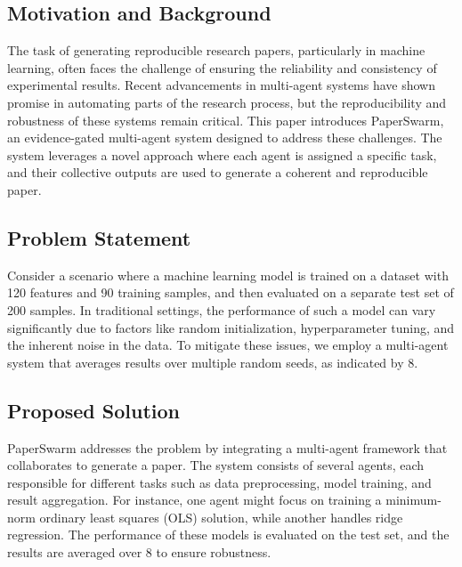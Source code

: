 \subsection{Motivation and Background}

The task of generating reproducible research papers, particularly in machine learning, often faces the challenge of ensuring the reliability and consistency of experimental results. Recent advancements in multi-agent systems have shown promise in automating parts of the research process, but the reproducibility and robustness of these systems remain critical. This paper introduces PaperSwarm, an evidence-gated multi-agent system designed to address these challenges. The system leverages a novel approach where each agent is assigned a specific task, and their collective outputs are used to generate a coherent and reproducible paper.

\subsection{Problem Statement}

Consider a scenario where a machine learning model is trained on a dataset with 120 features and 90 training samples, and then evaluated on a separate test set of 200 samples. In traditional settings, the performance of such a model can vary significantly due to factors like random initialization, hyperparameter tuning, and the inherent noise in the data. To mitigate these issues, we employ a multi-agent system that averages results over multiple random seeds, as indicated by 8.

\subsection{Proposed Solution}

PaperSwarm addresses the problem by integrating a multi-agent framework that collaborates to generate a paper. The system consists of several agents, each responsible for different tasks such as data preprocessing, model training, and result aggregation. For instance, one agent might focus on training a minimum-norm ordinary least squares (OLS) solution, while another handles ridge regression. The performance of these models is evaluated on the test set, and the results are averaged over 8 to ensure robustness.

